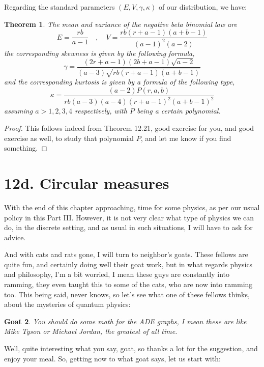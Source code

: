 \documentclass[12pt]{amsbook}
\newtheorem{theorem}{Theorem}[chapter]
\newtheorem{goat}[theorem]{Goat}
\begin{document}
Regarding the standard parameters $(E,V,\gamma,\kappa)$ of our distribution, we have:

\begin{theorem}
The mean and variance of the negative beta binomial law are
$$E=\frac{rb}{a-1}\quad,\quad V=\frac{rb(r+a-1)(a+b-1)}{(a-1)^2(a-2)}$$
the corresponding skewness is given by the following formula,
$$\gamma=\frac{(2r+a-1)(2b+a-1)\sqrt{a-2}}{(a-3)\sqrt{rb(r+a-1)(a+b-1)}}$$
and the corresponding kurtosis is given by a formula of the following type,
$$\kappa=\frac{(a-2)P(r,a,b)}{rb(a-3)(a-4)(r+a-1)^2(a+b-1)^2}$$
assuming $a>1,2,3,4$ respectively, with $P$ being a certain polynomial.
\end{theorem}

\begin{proof}
This follows indeed from Theorem 12.21, good exercise for you, and good exercise as well, to study that polynomial $P$, and let me know if you find something.
\end{proof}

\section*{12d. Circular measures}

With the end of this chapter approaching, time for some physics, as per our usual policy in this Part III. However, it is not very clear what type of physics we can do, in the discrete setting, and as usual in such situations, I will have to ask for advice.

\bigskip

And with cats and rats gone, I will turn to neighbor's goats. These fellows are quite fun, and certainly doing well their goat work, but in what regards physics and philosophy, I'm a bit worried, I mean these guys are constantly into ramming, they even taught this to some of the cats, who are now into ramming too. This being said, never knows, so let's see what one of these fellows thinks, about the mysteries of quantum physics: 

\begin{goat}
You should do some math for the ADE graphs, I mean these are like Mike Tyson or Michael Jordan, the greatest of all time.
\end{goat}

Well, quite interesting what you say, goat, so thanks a lot for the suggestion, and enjoy your meal. So, getting now to what goat says, let us start with:

\end{document}
